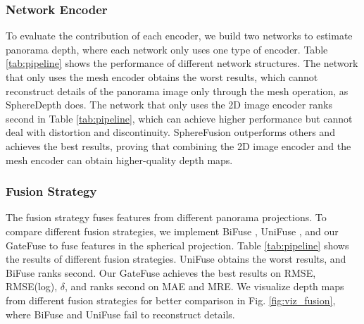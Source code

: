 \subsubsection{Network Encoder}
To evaluate the contribution of each encoder, we build two networks to estimate panorama depth, where each network only uses one type of encoder.
Table \ref{tab:pipeline} shows the performance of different network structures. 
The network that only uses the mesh encoder obtains the worst results, which cannot reconstruct details of the panorama image only through the mesh operation, as SphereDepth \cite{yan2022spheredepth} does.
The network that only uses the 2D image encoder ranks second in Table \ref{tab:pipeline}, which can achieve higher performance but cannot deal with distortion and discontinuity.
SphereFusion outperforms others and achieves the best results, proving that combining the 2D image encoder and the mesh encoder can obtain higher-quality depth maps.


\subsubsection{Fusion Strategy}
The fusion strategy fuses features from different panorama projections.
To compare different fusion strategies, we implement BiFuse \cite{wang2020bifuse}, UniFuse \cite{jiang2021unifuse}, and our GateFuse to fuse features in the spherical projection.
Table \ref{tab:pipeline} shows the results of different fusion strategies.
UniFuse obtains the worst results, and BiFuse ranks second.
Our GateFuse achieves the best results on RMSE, RMSE(log), $\delta$, and ranks second on MAE and MRE.
We visualize depth maps from different fusion strategies for better comparison in Fig. \ref{fig:viz_fusion}, where BiFuse and UniFuse fail to reconstruct details.


